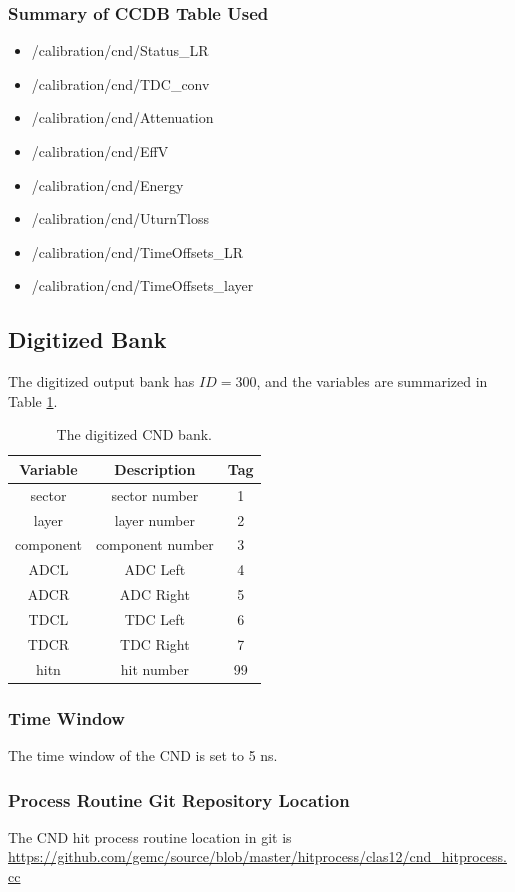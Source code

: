 \subsubsection{Summary of CCDB Table Used}
\begin{itemize}
	\item /calibration/cnd/Status\_LR
	\item /calibration/cnd/TDC\_conv
	\item /calibration/cnd/Attenuation
	\item /calibration/cnd/EffV
	\item /calibration/cnd/Energy
	\item /calibration/cnd/UturnTloss
	\item /calibration/cnd/TimeOffsets\_LR
	\item /calibration/cnd/TimeOffsets\_layer
\end{itemize}



\subsection{Digitized Bank}
The digitized output bank has $ID=300$, and the variables are summarized in Table \ref{tab:cndBank}.

\begin{table}[h]
	\begin{center}
		\begin{tabular}{| c | c | c |}
			\hline \hline
			Variable         & Description  & Tag  \\
			\hline
              sector  &                                     sector number  &    1   \\
               layer  &                                      layer number  &    2   \\
           component  &                                  component number  &    3   \\
                ADCL  &                                          ADC Left  &    4   \\
                ADCR  &                                         ADC Right  &    5   \\
                TDCL  &                                          TDC Left  &    6   \\
                TDCR  &                                         TDC Right  &    7   \\
                hitn  &                                        hit number  &   99   \\
			\hline \hline
		\end{tabular}
	\end{center}
	\caption{The digitized CND bank.}\label{tab:cndBank}
\end{table}


\subsubsection{Time Window}
The time window  of the CND is set to 5 ns.


\subsubsection{Process Routine Git Repository Location}
The CND hit process routine location in git is \url{https://github.com/gemc/source/blob/master/hitprocess/clas12/cnd_hitprocess.cc}
